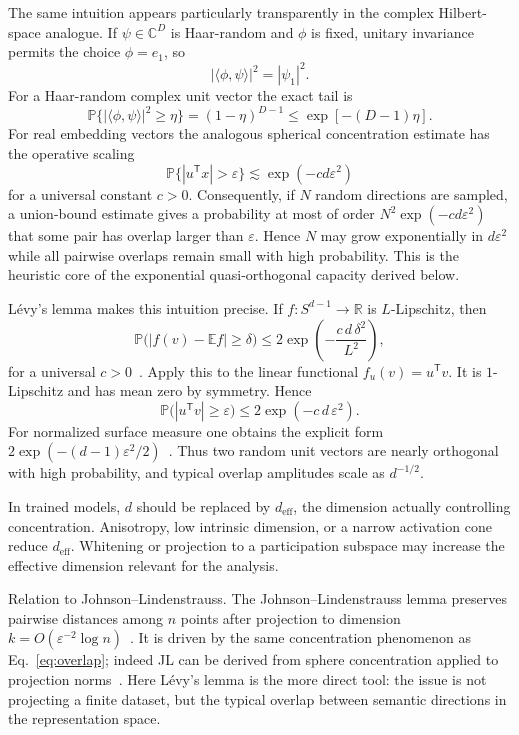 \documentclass[
  aps,
  reprint,
  superscriptaddress,
  floatfix,
  nofootinbib,
  longbibliography
]{revtex4-2}
\newcommand{\R}{\mathbb{R}}
\newcommand{\E}{\mathbb{E}}
\newcommand{\Prob}{\mathbb{P}}
\newcommand{\Sph}[1]{S^{#1}}
\newcommand{\deff}{d_{\mathrm{eff}}}
\newcommand{\T}{^{\mathsf{T}}}
\begin{document}
The same intuition appears particularly transparently in the complex
Hilbert-space analogue.  If $\psi\in\mathbb{C}^D$ is Haar-random and
$\phi$ is fixed, unitary invariance permits the choice $\phi=e_1$, so
\[
        |\langle\phi,\psi\rangle|^2=|\psi_1|^2 .
\]
For a Haar-random complex unit vector the exact tail is
\[
        \Prob\{ |\langle\phi,\psi\rangle|^2\geq\eta\}
        =(1-\eta)^{D-1}
        \leq \exp[-(D-1)\eta] .
\]
For real embedding vectors the analogous spherical concentration estimate
has the operative scaling
\[
        \Prob\{ |u\T x|>\varepsilon\}
        \lesssim \exp(-c d\varepsilon^2)
\]
for a universal constant $c>0$.  Consequently, if $N$ random directions are
sampled, a union-bound estimate gives a probability at most of order
$N^2\exp(-c d\varepsilon^2)$ that some pair has overlap larger than
$\varepsilon$.  Hence $N$ may grow exponentially in $d\varepsilon^2$ while
all pairwise overlaps remain small with high probability.  This is the
heuristic core of the exponential quasi-orthogonal capacity derived below.

L\'evy's lemma makes this intuition precise.  If $f:\Sph{d-1}\to\R$
is $L$-Lipschitz, then
%
\begin{equation}
\label{eq:levy}
\Prob\bigl(|f(v)-\E f|\ge\delta\bigr)
 \le
2\exp\!\left(-\frac{c\,d\,\delta^{2}}{L^{2}}\right),
\end{equation}
%
for a universal $c>0$~\cite{ledoux2001concentration,milman1986asymptotic}. Apply this to the
linear functional $f_u(v)=u\T v$. It is $1$-Lipschitz and has mean zero
by symmetry. Hence
%
\begin{equation}
\label{eq:overlap}
\Prob\bigl(|u\T v|\ge\varepsilon\bigr)
 \le 2\exp(-c\,d\,\varepsilon^{2}).
\end{equation}
%
For normalized surface measure one obtains the explicit form
$2\exp(-(d-1)\varepsilon^{2}/2)$~\cite{ledoux2001concentration}. Thus two random
unit vectors are nearly orthogonal with high probability, and typical
overlap amplitudes scale as $d^{-1/2}$.

In trained models, $d$ should be replaced by $\deff$, the dimension
actually controlling concentration. Anisotropy, low intrinsic
dimension, or a narrow activation cone reduce $\deff$. Whitening or
projection to a participation subspace may increase the effective
dimension relevant for the analysis.

{Relation to Johnson--Lindenstrauss.}
The Johnson--Lindenstrauss lemma preserves pairwise distances among
$n$ points after projection to dimension
$k=O(\varepsilon^{-2}\log n)$~\cite{johnson-1984}. It is driven by the
same concentration phenomenon as Eq.~\eqref{eq:overlap}; indeed JL can
be derived from sphere concentration applied to projection
norms~\cite{Dasgupta-2003}. Here L\'evy's lemma is the more direct tool:
the issue is not projecting a finite dataset, but the typical overlap
between semantic directions in the representation space.
\end{document}
